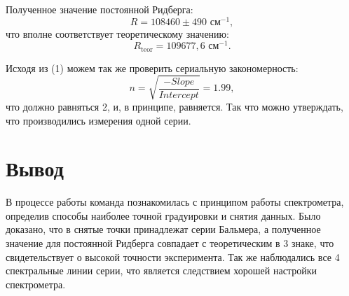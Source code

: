 \documentclass[a4paper, 14pt]{extarticle}%
\begin{document}
Полученное значение постоянной Ридберга:
\[R = 108460 \pm 490 \text{ см}^{-1},\]
что вполне соответствует теоретическому значению:
\[R_{\text{teor}} = 109677,6 \text{ см}^{-1}. \]

Исходя из (1) можем так же проверить сериальную закономерность:
\[n = \sqrt{\frac{-Slope}{Intercept}} = 1.99,\]
что должно равняться 2, и, в принципе, равняется. Так что можно утверждать, что производились измерения одной серии.

\section*{Вывод}

В процессе работы команда познакомилась с принципом работы спектрометра, определив способы наиболее точной градуировки и снятия данных. Было доказано, что в снятые точки принадлежат серии Бальмера, а полученное значение для постоянной Ридберга совпадает с теоретическим в 3 знаке, что свидетельствует о высокой точности эксперимента. Так же наблюдались все 4 спектральные линии серии, что является следствием хорошей настройки спектрометра. 
\end{document}

